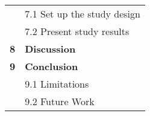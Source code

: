 \begin{table}[h]
{\begin{tabularx}{\textwidth}{@{} r Y @{}}
    & 7.1 Set up the study design\vspace{2mm}\\
    & 7.2 Present study results \vspace{2mm}\\
	\textbf{8}
	& \textbf{Discussion}\vspace{2mm}\\
	\textbf{9}
	& \textbf{Conclusion}\vspace{2mm}\\
    & 9.1 Limitations\vspace{2mm}\\
    & 9.2 Future Work\vspace{2mm}\\
\end{tabularx}
}
\end{table}